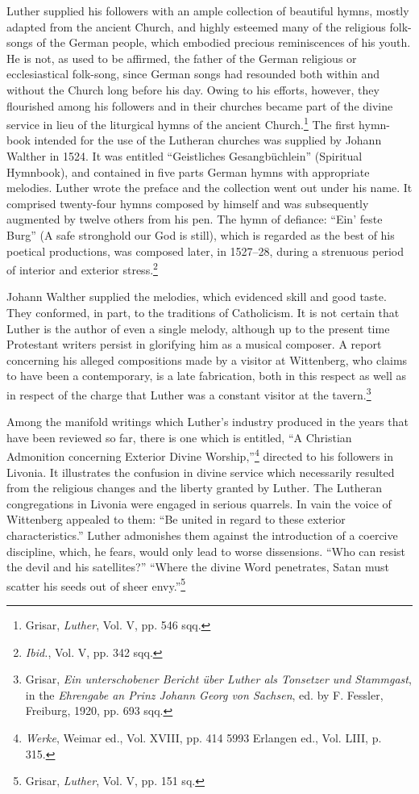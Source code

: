 Luther supplied his followers with an ample collection of beautiful hymns,
mostly adapted from the ancient Church, and highly
esteemed many of the religious folk-songs of the German people,
which embodied precious reminiscences of his youth. He is not, as
used to be affirmed, the father of the German religious or ecclesiastical
folk-song, since German songs had resounded both within
and without the Church long before his day. Owing to his efforts,
however, they flourished among his followers and in their churches
became part of the divine service in lieu of the liturgical hymns
of the ancient Church.\footnote{Grisar, \textit{Luther}, Vol. V, pp. 546 sqq.}
The first hymn-book intended for the
use of the Lutheran churches was supplied by Johann Walther in
1524. It was entitled “Geistliches Gesangbüchlein” (Spiritual Hymnbook),
and contained in five parts German hymns with appropriate
melodies. Luther wrote the preface and the collection went out
under his name. It comprised twenty-four hymns composed by himself and
was subsequently augmented by twelve others from his pen.
The hymn of defiance: “Ein’ feste Burg” (A safe stronghold our God
is still), which is regarded as the best of his poetical productions,
was composed later, in 1527--28, during a strenuous period of interior
and exterior stress.\footnote{\textit{Ibid.}, Vol. V, pp. 342 sqq.}

Johann Walther supplied the melodies, which evidenced skill and
good taste. They conformed, in part, to the traditions of Catholicism.
It is not certain that Luther is the author of even a single melody,
although up to the present time Protestant writers persist in glorifying
him as a musical composer. A report concerning his alleged compositions
made by a visitor at Wittenberg, who claims to have been a
contemporary, is a late fabrication, both in this respect as well as in
respect of the charge that Luther was a constant visitor at the
tavern.\footnote
{Grisar, \textit{Ein unterschobener Bericht über Luther als Tonsetzer und Stammgast}, in the
\textit{Ehrengabe an Prinz Johann Georg von Sachsen}, ed. by F. Fessler, Freiburg, 1920,
pp. 693 sqq.}

Among the manifold writings which Luther’s industry produced in
the years that have been reviewed so far, there is one which is entitled,
“A Christian Admonition concerning Exterior Divine Worship,”\footnote
{\textit{Werke}, Weimar ed., Vol. XVIII, pp. 414 5993 Erlangen ed., Vol. LIII, p. 315.}
directed to his followers in Livonia. It illustrates the confusion in
divine service which necessarily resulted from the religious
changes and the liberty granted by Luther. The Lutheran congregations
in Livonia were engaged in serious quarrels. In vain the voice
of Wittenberg appealed to them: “Be united in regard to these exterior
characteristics.” Luther admonishes them against the introduction of a
coercive discipline, which, he fears, would only lead to worse
dissensions. “Who can resist the devil and his satellites?” “Where the
divine Word penetrates, Satan must scatter his seeds out of sheer
envy.”\footnote{Grisar, \textit{Luther}, Vol. V, pp. 151 sq.}

